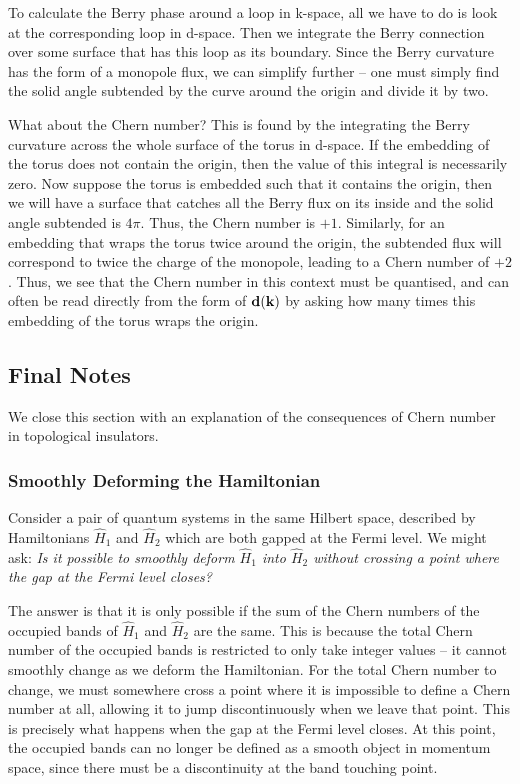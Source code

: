 To calculate the Berry phase around a loop in k-space, all we have to do is look at the corresponding loop in d-space. Then we integrate the Berry connection over some surface that has this loop as its boundary. Since the Berry curvature has the form of a monopole flux, we can simplify further -- one must simply find the solid angle subtended by the curve around the origin and divide it by two.

\begin{center}

\end{center}

What about the Chern number? This is found by the integrating the Berry curvature across the whole surface of the torus in d-space. If the embedding of the torus does not contain the origin, then the value of this integral is necessarily zero. Now suppose the torus is embedded such that it contains the origin, then we will have a surface that catches all the Berry flux on its inside and the solid angle subtended is $4\pi$. Thus, the Chern number is $+1$. Similarly, for an embedding that wraps the torus twice around the origin, the subtended flux will correspond to twice the charge of the monopole, leading to a Chern number of $+2$. Thus, we see that the Chern number in this context must be quantised, and can often be read directly from the form of $\textbf d(\textbf k)$ by asking how many times this embedding of the torus wraps the origin.

\subsection{Final Notes}

We close this section with an explanation of the consequences of Chern number in topological insulators.

\subsubsection{Smoothly Deforming the Hamiltonian}

Consider a pair of quantum systems in the same Hilbert space, described by Hamiltonians $\hat H_1$ and $\hat H_2$ which are both gapped at the Fermi level. We might ask: \textit{Is it possible to smoothly deform $\hat H _1$ into $\hat H_2$ without crossing a point where the gap at the Fermi level closes?}

The answer is that it is only possible if the sum of the Chern numbers of the occupied bands of $\hat H_1$ and $\hat H_2$ are the same. This is because the total Chern number of the occupied bands is restricted to only take integer values -- it cannot smoothly change as we deform the Hamiltonian. For the total Chern number to change, we must somewhere cross a point where it is impossible to define a Chern number at all, allowing it to jump discontinuously when we leave that point. This is precisely what happens when the gap at the Fermi level closes. At this point, the occupied bands can no longer be defined as a smooth object in momentum space, since there must be a discontinuity at the band touching point. 

